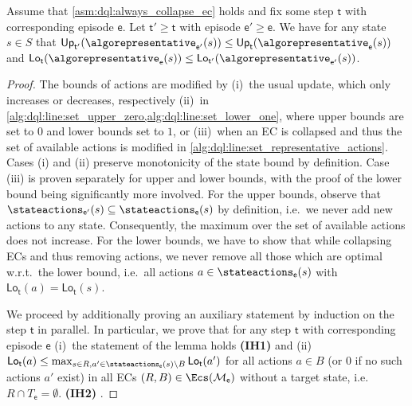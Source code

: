 \documentclass{article}
\makeatletter
\newcommand{\intersectionSym}{\cap}
\newcommand{\intersectionBin}{\mathbin{\intersectionSym}}
\newcommand{\intersection}{\intersectionBin}
\newcommand{\MDP}{\mathcal{M}}
\newcommand{\States}{S}
\newcommand{\upperbound}{\mathsf{Up}}
\newcommand{\lowerbound}{\mathsf{Lo}}
\newcommand{\targetset}{T}
\newcommand{\algostep}{\mathsf{t}}
\newcommand{\algoepisode}{\mathsf{e}}
\def\alabel#1#2{\begingroup
	\textbf{(#2)}\def\@currentlabel{\textbf{[#2]}}\phantomsection\label{#1}\endgroup
}
\makeatother
\begin{document}
\begin{lemma} \label{stm:dql:bounds_monotone}
	Assume that \cref{asm:dql:always_collapse_ec} holds and fix some step $\algostep$ with corresponding episode $\algoepisode$.
	Let $\algostep' \geq \algostep$ with episode $\algoepisode' \geq \algoepisode$.
	We have for any state $s \in \States$ that $\upperbound_{\algostep'}(\algorepresentative_{\algoepisode'}(s)) \leq \upperbound_{\algostep}(\algorepresentative_\algoepisode(s))$ and $\lowerbound_{\algostep}(\algorepresentative_\algoepisode(s)) \leq \lowerbound_{\algostep'}(\algorepresentative_{\algoepisode'}(s))$.
\end{lemma}

\begin{proof}
	The bounds of actions are modified by (i)~the usual update, which only increases or decreases, respectively (ii)~in \cref{alg:dql:line:set_upper_zero,alg:dql:line:set_lower_one}, where upper bounds are set to $0$ and lower bounds set to $1$, or (iii)~when an EC is collapsed and thus the set of available actions is modified in \cref{alg:dql:line:set_representative_actions}.
	Cases (i) and (ii) preserve monotonicity of the state bound by definition.
	Case (iii) is proven separately for upper and lower bounds, with the proof of the lower bound being significantly more involved.
	For the upper bounds, observe that $\stateactions_{\algoepisode'}(s) \subseteq \stateactions_{\algoepisode}(s)$ by definition, i.e.\ we never add new actions to any state.
	Consequently, the maximum over the set of available actions does not increase.
	For the lower bounds, we have to show that while collapsing ECs and thus removing actions, we never remove all those which are optimal w.r.t.\ the lower bound, i.e.\ all actions $a \in \stateactions_\algoepisode(s)$ with $\lowerbound_\algostep(a) = \lowerbound_\algostep(s)$.

	We proceed by additionally proving an auxiliary statement by induction on the step $\algostep$ in parallel.
	In particular, we prove that for any step $\algostep$ with corresponding episode $\algoepisode$ (i)~the statement of the lemma holds \alabel{proof:dql:lower_bounds_monotone:induction_lemma}{IH1} and (ii)~$\lowerbound_{\algostep}(a) \leq \max_{s \in R, a' \in \stateactions_{\algoepisode}(s) \setminus B} \lowerbound_\algostep(a')$ for all actions $a \in B$ (or $0$ if no such actions $a'$ exist) in all ECs $(R, B) \in \Ecs(\MDP_\algoepisode)$ without a target state, i.e.\ $R \intersection \targetset_\algoepisode = \emptyset$. \alabel{proof:dql:lower_bounds_monotone:induction_aux}{IH2}.


\end{proof}
\end{document}
